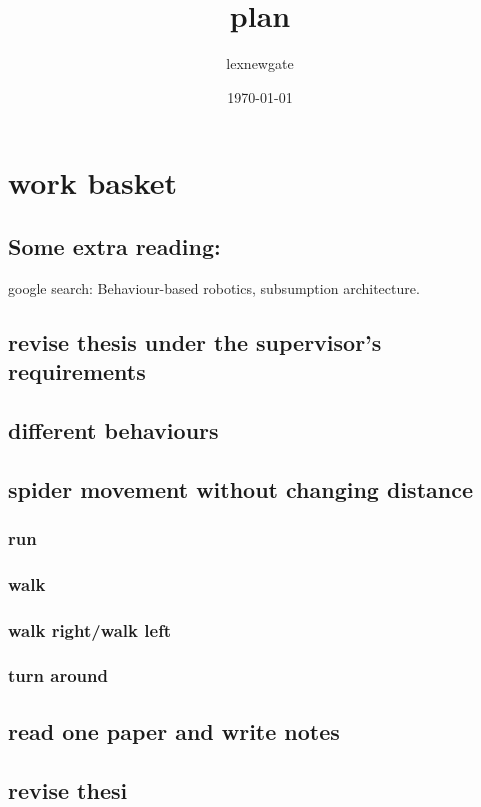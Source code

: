 \documentclass[11pt]{article}
\author{lexnewgate}
\date{\today}
\title{plan}
\begin{document}
\maketitle
\tableofcontents

\section{work basket}
\label{sec-1}
\subsection{Some extra reading:}
\label{sec-1-1}
google search: Behaviour-based robotics, subsumption architecture.
\subsection{revise thesis under the supervisor's requirements}
\label{sec-1-2}
\subsection{different behaviours}
\label{sec-1-3}

\subsection{spider movement without changing distance}
\label{sec-1-4}
\subsubsection{run}
\label{sec-1-4-1}
\subsubsection{walk}
\label{sec-1-4-2}
\subsubsection{walk right/walk left}
\label{sec-1-4-3}
\subsubsection{turn around}
\label{sec-1-4-4}
\subsection{read one paper and write notes}
\label{sec-1-5}
\subsection{revise thesi}
\label{sec-1-6}
\end{document}
